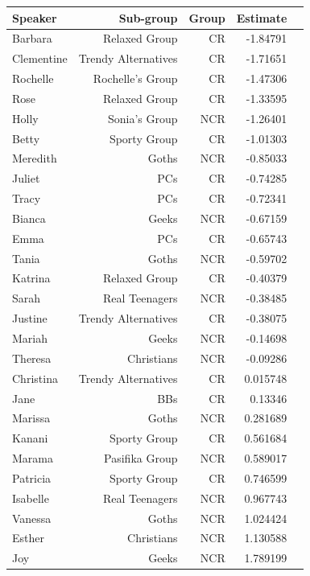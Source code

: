 \begin{table}[htbp]
\begin{center}
\begin{tabular}{lrrrr}
  \hline
Speaker & Sub-group & Group & Estimate \\
\hline
Barbara	  &  Relaxed Group & CR   &  -1.84791\\
Clementine	& Trendy Alternatives  & CR  & -1.71651\\
Rochelle	&  Rochelle's Group & CR    &  -1.47306\\
Rose	    &  Relaxed Group  & CR  &  -1.33595\\
Holly	  &  Sonia's Group & NCR   &  -1.26401\\
Betty	  &  Sporty Group   & CR   &  -1.01303\\
Meredith  & Goths         & NCR  &	 -0.85033\\
Juliet	& PCs &       CR        & -0.74285\\
Tracy	  &  PCs            & CR   &  -0.72341\\
Bianca	&  Geeks         & NCR  & -0.67159\\
Emma	&  PCs             & CR     &  -0.65743\\
Tania	  &  Goths          & NCR &  -0.59702\\
Katrina	& Relaxed Group  & CR   &   -0.40379\\
Sarah	  &  Real Teenagers & NCR & -0.38485\\
Justine	&  Trendy Alternatives &       CR    &  -0.38075\\
Mariah	& Geeks &    NCR        &   -0.14698\\
Theresa	& Christians & NCR     & -0.09286\\
Christina	& Trendy Alternatives & CR &  0.015748\\
Jane	& BBs  &             CR    &  0.13346\\
Marissa	& Goths          & NCR  &  0.281689 \\
Kanani  & Sporty Group   & CR  &  0.561684\\
Marama	& Pasifika Group & NCR     & 0.589017\\
Patricia & Sporty Group  & CR  &	0.746599\\
Isabelle & Real Teenagers & NCR &	0.967743  \\
Vanessa	& Goths     & NCR     & 1.024424\\
Esther	& Christians     & NCR & 1.130588\\
Joy	    & Geeks     & NCR     & 1.789199\\

\end{tabular}
\end{center}
\end{table}
